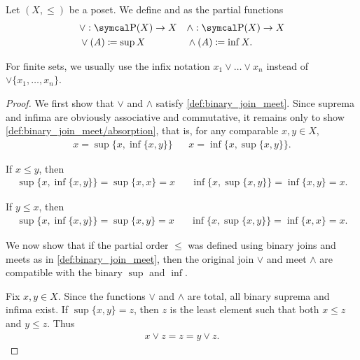 \begin{definition}\label{def:join_meet}
  Let \( (X, \leq) \) be a poset. We define  and  as the partial functions
  \begin{align*}
    &\lor: \Power(X) \to X
    &&\land: \Power(X) \to X
    \\
    &\lor(A) \coloneqq \sup X
    &&\land(A) \coloneqq \inf X.
  \end{align*}

  For finite sets, we usually use the infix notation \( x_1 \lor \ldots \lor x_n \) instead of \( \lor \{ x_1, \ldots, x_n \} \).
\end{definition}
\begin{proof}
  We first show that \( \lor \) and \( \land \) satisfy \cref{def:binary_join_meet}. Since suprema and infima are obviously associative and commutative, it remains only to show \ref{def:binary_join_meet/absorption}, that is, for any comparable \( x, y \in X \),
  \begin{align*}
    x = \sup \{x, \inf \{ x, y \} \}
    &&
    x = \inf \{x, \sup \{ x, y \} \}.
  \end{align*}

  If \( x \leq y \), then
  \begin{align*}
    \sup \{ x, \inf \{ x, y \} \} = \sup \{ x, x \} = x
    &&
    \inf \{ x, \sup \{ x, y \} \} = \inf \{ x, y \} = x.
  \end{align*}

  If \( y \leq x \), then
  \begin{align*}
    \sup \{ x, \inf \{ x, y \} \} = \sup \{ x, y \} = x
    &&
    \inf \{ x, \sup \{ x, y \} \} = \inf \{ x, x \} = x.
  \end{align*}

  We now show that if the partial order \( \leq \) was defined using binary joins and meets as in \cref{def:binary_join_meet}, then the original join \( \lor \) and meet \( \land \) are compatible with the binary \( \sup \) and \( \inf \).

  Fix \( x, y \in X \). Since the functions \( \lor \) and \( \land \) are total, all binary suprema and infima exist. If \( \sup \{ x, y \} = z \), then \( z \) is the least element such that both \( x \leq z \) and \( y \leq z \). Thus
  \begin{align*}
    x \lor z = z = y \lor z.
  \end{align*}


\end{proof}
